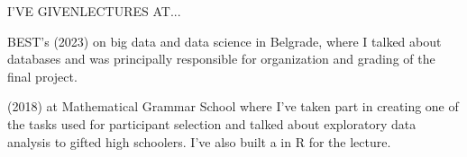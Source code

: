 \begin{minipage}[t]{\linewidth}\vspace{\sectionTopmargin}
{\alignRight\titleFont\light I'VE GIVEN\linebreak\alignRight LECTURES AT...}\linebreak\newline

\vspace{\contentTopMargin}
{\contentFont\bold BEST's  \medium (2023) on big data and data science in Belgrade, where I talked about databases and was principally responsible for organization and grading of the final project.}

\vspace{2mm}
{\contentFont\bold {} \medium (2018) at Mathematical Grammar School where I've taken part in creating one of the tasks used for participant selection and talked about exploratory data analysis to gifted high schoolers. I've also built a  in R for the lecture.}
\end{minipage}